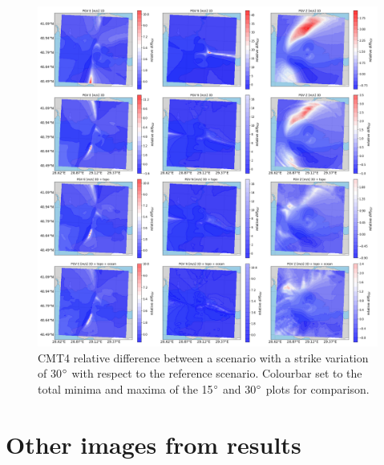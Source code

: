 \documentclass[../Text/00main.tex]{subfiles}
\begin{document}
\begin{figure}[!h]
    \centering
    \includegraphics[width=1.2\linewidth]{images_results/rake_variation_epsilon25_sc4.png}
    \caption{CMT4 relative difference between a scenario with a strike variation of 30$\degree$ with respect to the reference scenario. Colourbar set to the total minima and maxima of the 15$\degree$ and 30$\degree$ plots for comparison.}
    \label{fig:ref_eps25-2}
\end{figure}

\FloatBarrier






\section{Other images from results}
\end{document}
